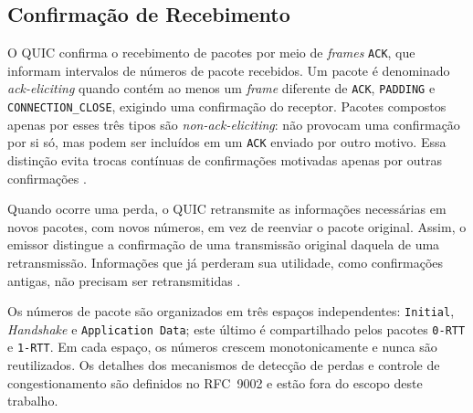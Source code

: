 \subsection{Confirmação de Recebimento}
\label{sec:quic_acknowledgement}

O QUIC confirma o recebimento de pacotes por meio de \textit{frames} \texttt{ACK}, que informam intervalos de números de pacote recebidos. Um pacote é denominado \textit{ack-eliciting} quando contém ao menos um \textit{frame} diferente de \texttt{ACK}, \texttt{PADDING} e \texttt{CONNECTION\_\allowbreak{}CLOSE}, exigindo uma confirmação do receptor. Pacotes compostos apenas por esses três tipos são \textit{non-ack-eliciting}: não provocam uma confirmação por si só, mas podem ser incluídos em um \texttt{ACK} enviado por outro motivo. Essa distinção evita trocas contínuas de confirmações motivadas apenas por outras confirmações \citep{rfc9000, rfc9002}.

Quando ocorre uma perda, o QUIC retransmite as informações necessárias em novos pacotes, com novos números, em vez de reenviar o pacote original. Assim, o emissor distingue a confirmação de uma transmissão original daquela de uma retransmissão. Informações que já perderam sua utilidade, como confirmações antigas, não precisam ser retransmitidas \citep{rfc9000, rfc9002}.

Os números de pacote são organizados em três espaços independentes: \texttt{Initial}, \textit{Handshake} e \texttt{Application Data}; este último é compartilhado pelos pacotes \texttt{0-RTT} e \texttt{1-RTT}. Em cada espaço, os números crescem monotonicamente e nunca são reutilizados. Os detalhes dos mecanismos de detecção de perdas e controle de congestionamento são definidos no RFC~9002 \citep{rfc9002} e estão fora do escopo deste trabalho.

